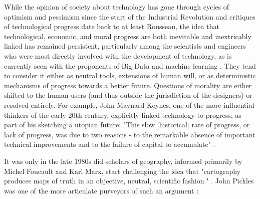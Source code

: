 While the opinion of society about technology has gone through cycles of optimism and pessimism since the start of the Industrial Revolution and critiques of technological progress date back to at least Rousseau, the idea that technological, economic, and moral progress are both inevitable and inextricably linked has remained persistent, particularly among the scientists and engineers who were most directly involved with the development of technology\cite{mazlish1963}, as is currently seen with the proponents of Big Data and machine learning \cite{boydCriticalQuestionsBig2012}. They tend to consider it either as neutral tools, extensions of human will, or as deterministic mechanisms of progress towards a better future. Questions of morality are either shifted to the human users (and thus outside the jurisdiction of the designers) or resolved entirely. For example, John Maynard Keynes, one of the more influential thinkers of the early 20th century, explicitly linked technology to progress, as part of his sketching a utopian future: "This slow [historical] rate of progress, or lack of progress, was due to two reasons - to the remarkable absence of important technical improvements and to the failure of capital to accumulate" \cite{keynesEconomicPossibilitiesOur2010}.


It was only in the late 1980s did scholars of geography, informed primarily by Michel Foucault and Karl Marx, start challenging the idea that "cartography produces maps of truth in an objective, neutral, scientific fashion." \cite{kitchinThinkingMaps2011}. John Pickles was one of the more articulate purveyors of such an argument \cite{picklesGroundTruthSocial1994}:

